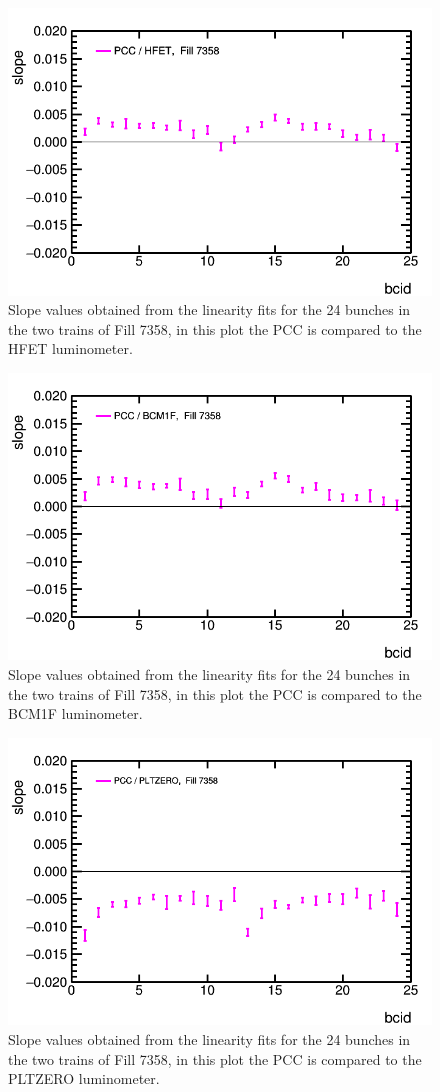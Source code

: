 \clearpage
\begin{figure}[t]
  \begin{center}
    \includegraphics[width=0.47\linewidth]{plots/sbilratios_trains_Fill7358/plot_det_linearity_perbx_slope_7358_hfet.png}
    \caption{
      Slope values obtained from the linearity fits for the 24 bunches in the two trains of Fill 7358, in this plot the PCC is compared to the HFET luminometer.
      \label{fig:fill7358trainslope_hfet}
    }
  \end{center}
\end{figure}

\begin{figure}[t]
  \begin{center}
    \includegraphics[width=0.47\linewidth]{plots/sbilratios_trains_Fill7358/plot_det_linearity_perbx_slope_7358_bcm.png}
    \caption{
      Slope values obtained from the linearity fits for the 24 bunches in the two trains of Fill 7358, in this plot the PCC is compared to the BCM1F luminometer.
      \label{fig:fill7358trainslope_bcm}
    }
  \end{center}
\end{figure}

\begin{figure}[t]
  \begin{center}
    \includegraphics[width=0.47\linewidth]{plots/sbilratios_trains_Fill7358/plot_det_linearity_perbx_slope_7358_plt.png}
    \caption{
      Slope values obtained from the linearity fits for the 24 bunches in the two trains of Fill 7358, in this plot the PCC is compared to the PLTZERO luminometer.
      \label{fig:fill7358trainslope_plt}
    }
  \end{center}
\end{figure}


